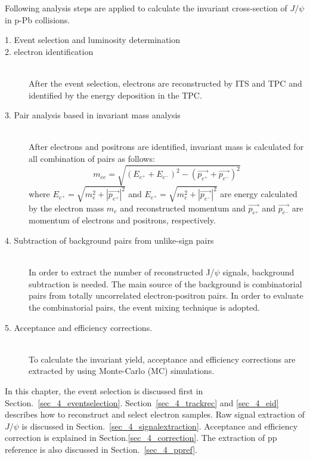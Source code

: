 Following analysis steps are applied to calculate the invariant cross-section of $J/\psi$ in p-Pb collisions.
\begin{description}
  \item[1. Event selection and luminosity determination]
  \item[2. electron identification ]\mbox{}\\
    After the event selection, electrons are reconstructed by ITS and TPC and identified by the energy deposition in the TPC. 
  \item[3. Pair analysis based in invariant mass analysis ]\mbox{} \\
    After electrons and positrons are identified, invariant mass is calculated for all combination of pairs as follows:
    \begin{equation}
      m_{ee} = \sqrt{(E_{e^{+}}+E_{e^{-}})^{2}-(\vec{p_{e^{+}}} + \vec{p_{e^{-}}})^{2}}
    \end{equation}
    where $E_{e^{+}}=\sqrt{m_{e}^{2}+|\vec{p_{e^{+}}}|^{2}}$ and $E_{e^{+}}=\sqrt{m_{e}^{2}+|\vec{p_{e^{-}}}|^{2}}$ are energy calculated by the electron mass $m_{e}$ and reconstructed momentum and $\vec{p_{e^{+}}}$ and $\vec{p_{e^{-}}}$ are momentum of electrons and positrons, respectively.
  \item[4. Subtraction of background pairs from unlike-sign pairs]\mbox{} \\   
    In order to extract the number of reconstructed J/$\psi$ signals, background subtraction is needed. 
    The main source of the background is combinatorial pairs from totally uncorrelated electron-positron pairs. 
    In order to evaluate the combinatorial pairs, the event mixing technique is adopted.  
  \item[5. Acceptance and efficiency corrections.]\mbox{}\\
    To calculate the invariant yield, acceptance and efficiency corrections are extracted by using Monte-Carlo (MC) simulations.
\end{description}

In this chapter, the event selection is discussed first in Section.~\ref{sec_4_eventselection}.
Section~\ref{sec_4_trackrec} and \ref{sec_4_eid} describes how to reconstruct and select electron samples.  
Raw signal extraction of $J/\psi$ is discussed in Section.~\ref{sec_4_signalextraction}. 
Acceptance and efficiency correction is explained in Section.\ref{sec_4_correction}. 
The extraction of pp reference is also discussed in Section.~\ref{sec_4_ppref}.

